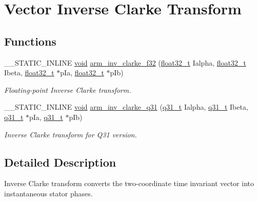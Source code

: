 \hypertarget{group__inv__clarke}{\section{Vector Inverse Clarke Transform}
\label{group__inv__clarke}
}
\subsection*{Functions}
\begin{DoxyCompactItemize}
\item 
\-\_\-\-\_\-\-S\-T\-A\-T\-I\-C\-\_\-\-I\-N\-L\-I\-N\-E \hyperlink{group___n_a_m_e_ga18028b8badbf1ea7e704ccac3c488e82}{void} \hyperlink{group__inv__clarke_gaafd9fc091f9d8eb8ff6d699029dedd2b}{arm\-\_\-inv\-\_\-clarke\-\_\-f32} (\hyperlink{arm__math_8h_a4611b605e45ab401f02cab15c5e38715}{float32\-\_\-t} Ialpha, \hyperlink{arm__math_8h_a4611b605e45ab401f02cab15c5e38715}{float32\-\_\-t} Ibeta, \hyperlink{arm__math_8h_a4611b605e45ab401f02cab15c5e38715}{float32\-\_\-t} $\ast$p\-Ia, \hyperlink{arm__math_8h_a4611b605e45ab401f02cab15c5e38715}{float32\-\_\-t} $\ast$p\-Ib)
\begin{DoxyCompactList}\small\item\em Floating-\/point Inverse Clarke transform. \end{DoxyCompactList}\item 
\-\_\-\-\_\-\-S\-T\-A\-T\-I\-C\-\_\-\-I\-N\-L\-I\-N\-E \hyperlink{group___n_a_m_e_ga18028b8badbf1ea7e704ccac3c488e82}{void} \hyperlink{group__inv__clarke_ga3748c30bd43701d14933735d7faf900e}{arm\-\_\-inv\-\_\-clarke\-\_\-q31} (\hyperlink{arm__math_8h_adc89a3547f5324b7b3b95adec3806bc0}{q31\-\_\-t} Ialpha, \hyperlink{arm__math_8h_adc89a3547f5324b7b3b95adec3806bc0}{q31\-\_\-t} Ibeta, \hyperlink{arm__math_8h_adc89a3547f5324b7b3b95adec3806bc0}{q31\-\_\-t} $\ast$p\-Ia, \hyperlink{arm__math_8h_adc89a3547f5324b7b3b95adec3806bc0}{q31\-\_\-t} $\ast$p\-Ib)
\begin{DoxyCompactList}\small\item\em Inverse Clarke transform for Q31 version. \end{DoxyCompactList}\end{DoxyCompactItemize}


\subsection{Detailed Description}
Inverse Clarke transform converts the two-\/coordinate time invariant vector into instantaneous stator phases.

